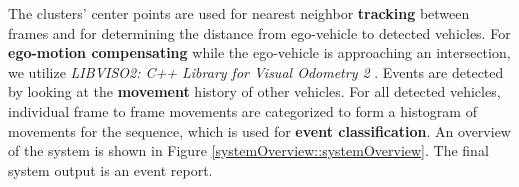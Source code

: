 \begin{multicols}{2}   
The clusters' center points are used for nearest neighbor \textbf{tracking} between frames and for determining the distance from ego-vehicle to detected vehicles.
For \textbf{ego-motion compensating} while the ego-vehicle is approaching an intersection, we utilize \textit{LIBVISO2: C++ Library for Visual Odometry 2} \cite{Geiger2011IV}. 
Events are detected by looking at the \textbf{movement} history of other vehicles. For all detected vehicles, individual frame to frame movements are categorized to form a histogram of movements for the sequence, which is used for \textbf{event classification}.
An overview of the system is shown in Figure \ref{systemOverview::systemOverview}. The final system output is an event report.


\end{multicols}



